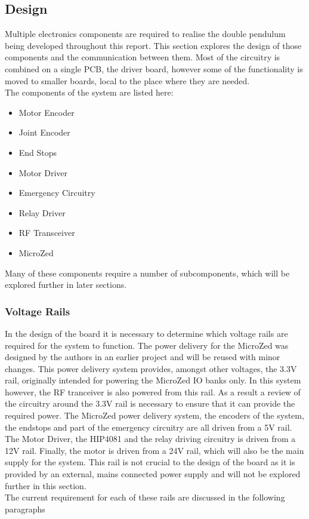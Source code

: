 \subsection{Design}
\label{sub:controller_board_design}

Multiple electronics components are required to realise the double pendulum being developed throughout this report.
This section explores the design of those components and the communication between them.
Most of the circuitry is combined on a single PCB, the driver board, however some of the functionality is moved to smaller boards, local to the place where they are needed.\\

The components of the system are listed here:
\begin{itemize}
	\item Motor Encoder
	\item Joint Encoder
	\item End Stops
	\item Motor Driver
	\item Emergency Circuitry
	\item Relay Driver
	\item RF Transceiver
	\item MicroZed 
\end{itemize}
Many of these components require a number of subcomponents, which will be explored further in later sections.

\subsubsection{Voltage Rails} %
\label{subsub:voltage_rails}
In the design of the board it is necessary to determine which voltage rails are required for the system to function.
The power delivery for the MicroZed was designed by the authors in an earlier project \cite{isaswarm} and will be reused with minor changes.
This power delivery system provides, amongst other voltages, the 3.3V rail, originally intended for powering the MicroZed IO banks only.
In this system however, the RF tranceiver is also powered from this rail.
As a result a review of the circuitry around the 3.3V rail is necessary to ensure that it can provide the required power.
The MicroZed power delivery system, the encoders of the system, the endstops and part of the emergency circuitry are all driven from a 5V rail.
The Motor Driver, the HIP4081 \cite{driver} and the relay driving circuitry is driven from a 12V rail.
Finally, the motor is driven from a 24V rail, which will also be the main supply for the system.
This rail is not crucial to the design of the board as it is provided by an external, mains connected power supply and will not be explored further in this section.\\
The current requirement for each of these rails are discussed in the following paragraphs

